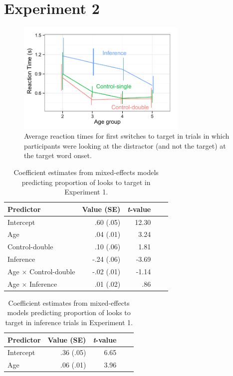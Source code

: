 \documentclass[10pt,letterpaper]{article}
\begin{document}
\section{Experiment 2}

\begin{figure}
\begin{centering} 
\includegraphics[width=3.2in]{figures/expt1-rt.pdf}
\caption{\label{fig:rt} Average reaction times for first switches to target in trials in which participants were looking at the distractor (and not the target) at the target word onset.}
\end{centering} 
\end{figure}

\begin{table}[b!]
\caption{\label{tab:lmer1}  Coefficient estimates from mixed-effects models predicting proportion of looks to target in Experiment 1.} 
\begin{center} 
\begin{tabular}{l r r r l} 
\hline
Predictor  &  Value (SE) & \emph{t}-value\\
\hline
Intercept  & .60 (.05) & 12.30 \\
Age & .04 (.01) &  3.24 \\
Control-double & .10 (.06) & 1.81 \\
Inference & -.24 (.06) & -3.69 \\
Age $\times$ Control-double & -.02 (.01) & -1.14 \\
Age $\times$ Inference & .01 (.02) & .86 \\
\hline
\end{tabular} 
\end{center} 
\end{table}

\begin{table}[b!]
\caption{\label{tab:lmer2}  Coefficient estimates from mixed-effects models predicting proportion of looks to target in inference trials in Experiment 1.} 
\begin{center} 
\begin{tabular}{l r r r l} 
\hline
Predictor  &  Value (SE) & \emph{t}-value\\
\hline
Intercept  & .36 (.05) & 6.65 \\
Age & .06 (.01) &  3.96 \\
\hline
\end{tabular} 
\end{center} 
\end{table}
\end{document}
